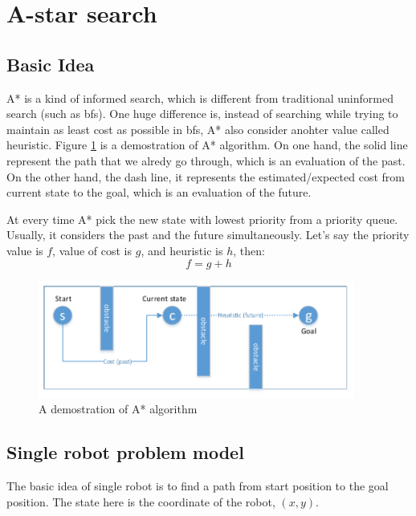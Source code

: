 \clearpage
\section{A-star search}
\subsection{Basic Idea}

A* is a kind of informed search, which is different from traditional uninformed search (such as bfs). One huge difference is, instead of searching while trying to maintain as least cost as possible in bfs, A* also consider anohter value called heuristic. Figure \ref{astar} is a demostration of A* algorithm. On one hand, the solid line represent the path that we alredy go through, which is an evaluation of the past. On the other hand, the dash line, it represents the estimated/expected cost from current state to the goal, which is an evaluation of the future. 

At every time A* pick the new state with lowest priority from a priority queue. Usually, it considers the past and the future simultaneously. Let's say the priority value is $f$, value of cost is $g$, and heuristic is $h$, then:
$$f = g + h$$

\begin{figure}[!h]
\centering
\includegraphics[width=0.927\textwidth]{astar.pdf}
\caption{A demostration of A* algorithm}
\label{astar}
\end{figure}



\subsection{Single robot problem model}
The basic idea of single robot is to find a path from start position to the goal position. The state here is the coordinate of the robot, $(x,y)$.





